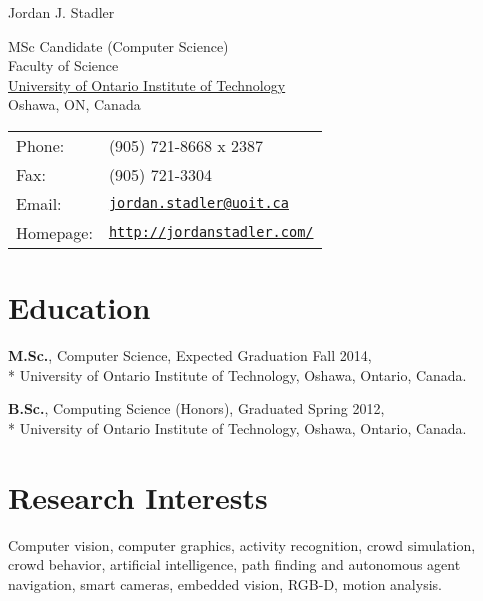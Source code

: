 \documentclass[letterpaper]{article}
\def\name{Jordan J. Stadler}
\renewenvironment{itemize}{
  \begin{list}{}{
    \setlength{\leftmargin}{1.5em}
  }
}{
  \end{list}
}
\begin{document}
{\huge \name}


\vspace{0.25in}

\begin{minipage}{0.45\linewidth}
  MSc Candidate (Computer Science) \\
  Faculty of Science \\
 \href{http://www.uoit.ca/}{University of Ontario Institute of Technology} \\
  Oshawa, ON, Canada
\end{minipage}
\begin{minipage}{0.45\linewidth}
  \begin{tabular}{ll}
    Phone: & (905) 721-8668 x 2387\\
    Fax: &  (905) 721-3304 \\
    Email: & \href{mailto:jordan.stadler@uoit.ca}{\tt jordan.stadler@uoit.ca} \\
    Homepage: & \href{http://jordanstadler.com/}{\tt http://jordanstadler.com/} \\
  \end{tabular}
\end{minipage}


\section*{Education}

\begin{itemize}
  \item \textbf{M.Sc.}, Computer Science, Expected Graduation Fall 2014,\\*
    University of Ontario Institute of Technology, Oshawa, Ontario, Canada.
  \item\textbf{B.Sc.}, Computing Science (Honors), Graduated Spring 2012,\\*
    University of Ontario Institute of Technology, Oshawa, Ontario, Canada.
\end{itemize}

\section*{Research Interests}
\begin{itemize}
\item Computer vision, computer graphics, activity recognition, crowd simulation, 
crowd behavior, artificial intelligence, path finding and autonomous agent 
navigation, smart cameras, embedded vision, RGB-D, motion analysis.
\end{itemize}
\end{document}
